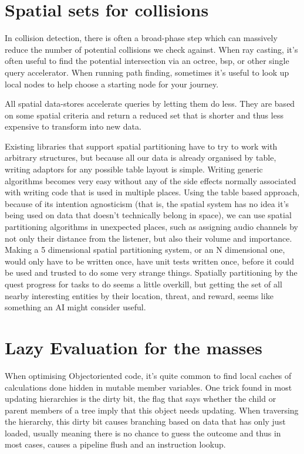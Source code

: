 \section{Spatial sets for collisions}

In collision detection, there is often a broad-phase step which can massively
reduce the number of potential collisions we check against. When ray casting,
it's often useful to find the potential intersection via an octree, bsp, or
other single query accelerator. When running path finding, sometimes it's
useful to look up local nodes to help choose a starting node for your journey.

All spatial data-stores accelerate queries by letting them do less. They are
based on some spatial criteria and return a reduced set that is shorter and
thus less expensive to transform into new data.

Existing libraries that support spatial partitioning have to try to work with
arbitrary structures, but because all our data is already organised by table,
writing adaptors for any possible table layout is simple. Writing generic
algorithms becomes very easy without any of the side effects normally
associated with writing code that is used in multiple places. Using the table
based approach, because of its intention agnosticism (that is, the spatial
system has no idea it's being used on data that doesn't technically belong in
space), we can use spatial partitioning algorithms in unexpected places, such
as assigning audio channels by not only their distance from the listener, but
also their volume and importance. Making a 5 dimensional spatial partitioning
system, or an N dimensional one, would only have to be written once, have unit
tests written once, before it could be used and trusted to do some very strange
things. Spatially partitioning by the quest progress for tasks to do seems a
little overkill, but getting the set of all nearby interesting entities by
their location, threat, and reward, seems like something an AI might consider
useful.

\section{Lazy Evaluation for the masses}

When optimising Object\-oriented code, it's quite common to find local caches
of calculations done hidden in mutable member variables. One trick found in
most updating hierarchies is the dirty bit, the flag that says whether the
child or parent members of a tree imply that this object needs updating. When
traversing the hierarchy, this dirty bit causes branching based on data that
has only just loaded, usually meaning there is no chance to guess the outcome
and thus in most cases, causes a pipeline flush and an instruction lookup.

